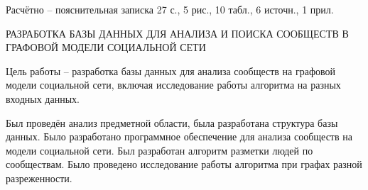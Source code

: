 
Расчётно -- пояснительная записка 27 с., 5 рис., 10 табл., 6 источн., 1 прил.

РАЗРАБОТКА БАЗЫ ДАННЫХ ДЛЯ АНАЛИЗА И ПОИСКА СООБЩЕСТВ В ГРАФОВОЙ МОДЕЛИ СОЦИАЛЬНОЙ СЕТИ

Цель работы -- разработка базы данных для анализа сообществ на графовой модели социальной сети, включая исследование работы алгоритма на разных входных данных.

Был проведён анализ предметной области, была разработана структура базы данных. Было разработано программное обеспечение для анализа сообществ на модели социальной сети. Был разработан алгоритм разметки людей по сообществам. Было проведено исследование работы алгоритма при графах разной разреженности.